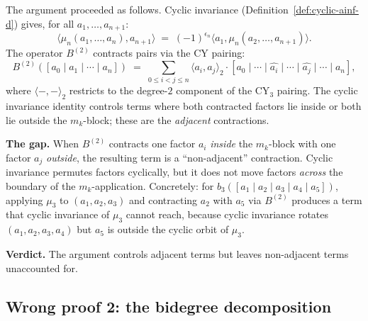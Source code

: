 \begin{remark}
\label{rem:wrong-proof-cyclic}
The argument proceeded as follows.  Cyclic invariance
(Definition~\ref{def:cyclic-ainf-d}) gives, for all
$a_1, \ldots, a_{n+1}$:
\[
 \langle \mu_n(a_1, \ldots, a_n), a_{n+1} \rangle
 \;=\; (-1)^{\epsilon_n}
 \langle a_1, \mu_n(a_2, \ldots, a_{n+1}) \rangle.
\]
The operator $B^{(2)}$ contracts pairs via the CY pairing:
\[
 B^{(2)}([a_0 \mid a_1 \mid \cdots \mid a_n])
 \;=\; \sum_{0 \leq i < j \leq n}
 \langle a_i, a_j \rangle_2 \cdot
 [a_0 \mid \cdots \mid \widehat{a_i} \mid \cdots
 \mid \widehat{a_j} \mid \cdots \mid a_n],
\]
where $\langle -, - \rangle_2$ restricts to the degree-$2$
component of the CY$_3$ pairing.  The cyclic invariance
identity controls terms where both contracted factors lie inside
or both lie outside the $m_k$-block; these are the
\emph{adjacent} contractions.

\textbf{The gap.}  When $B^{(2)}$ contracts one factor $a_i$
\emph{inside} the $m_k$-block with one factor $a_j$
\emph{outside}, the resulting term is a ``non-adjacent''
contraction.  Cyclic invariance permutes factors cyclically, but
it does not move factors \emph{across} the boundary of the
$m_k$-application.  Concretely: for
$b_3([a_1 \mid a_2 \mid a_3 \mid a_4 \mid a_5])$,
applying $\mu_3$ to $(a_1, a_2, a_3)$ and contracting $a_2$
with $a_5$ via $B^{(2)}$ produces a term that cyclic invariance
of $\mu_3$ cannot reach, because cyclic invariance rotates
$(a_1, a_2, a_3, a_4)$ but $a_5$ is outside the cyclic orbit
of $\mu_3$.

\textbf{Verdict.}  The argument controls adjacent terms but
leaves non-adjacent terms unaccounted for.
\end{remark}


\subsection{Wrong proof 2: the bidegree decomposition}
\label{subsec:wrong-bidegree}

